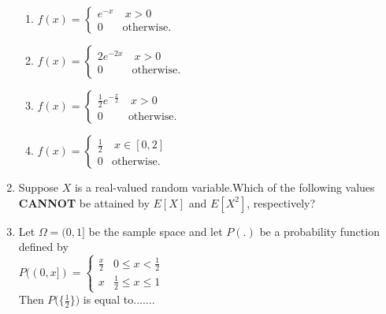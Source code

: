 \begin{enumerate}[label=\thesection.\arabic*.,ref=\thesection.\theenumi]
\begin{enumerate}

\item $ 
f(x)=
\begin{cases}
e^{-x} &  \ x>0\\
0 & \text{otherwise}.
\end{cases}
$\\ 

\item $ 
f(x)=
\begin{cases}
2e^{-2x} & \ x>0\\
0 & \text{otherwise}.
\end{cases}
$\\ 

\item $ 
f(x)=
\begin{cases}
\frac{1}{2}e^{-\frac{x}{2}} &  \ x>0\\
0 & \text{otherwise}.
\end{cases}
$\\ 

\item $ 
f(x)=
\begin{cases}
\frac{1}{2} &  \ x \in [0,2]\\
0 & \text{otherwise}.
\end{cases}
$\\ 



\end{enumerate}

\item Suppose $X$ is a real-valued random variable.Which of the following values \textbf{CANNOT} be attained by $E[X]$ and $E[X^2]$, respectively?


\begin{enumerate}
\end{enumerate}
\solution


\item Let $\Omega = (0,1]$ be the sample space and let $P(.)$ be a probability function defined by \\
$
P((0,x])=
\begin{cases}
\frac{x}{2} 
&  0 \leqslant x < \frac{1}{2} \\
x &  \frac{1}{2} \leqslant x \leqslant 1
\end{cases}
$ \\
Then $P \bigg ( \{ \frac{1}{2} \} \bigg )$ is equal to.......


\end{enumerate}
